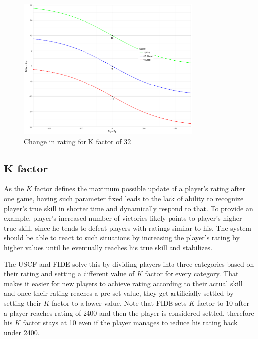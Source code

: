 \begin{figure}[H]
\centering
\includegraphics[width=0.8\textwidth]{figs/elo_k_factor}
\caption{Change in rating for K factor of 32}
\label{fig:k_factor}
\end{figure}

\subsection{K factor}
\label{sec:k_factor}
As the $K$ factor defines the maximum possible update of a player's rating after one game, having such parameter fixed leads to the lack of ability to recognize player's true skill in shorter time and dynamically respond to that. To provide an example, player's increased number of victories likely points to player's higher true skill, since he tends to defeat players with ratings similar to his. The system should be able to react to such situations by increasing the player's rating by higher values until he eventually reaches his true skill and stabilizes.

The USCF and FIDE solve this by dividing players into three categories based on their rating and setting a different value of $K$ factor for every category. That makes it easier for new players to achieve rating according to their actual skill and once their rating reaches a pre-set value, they get artificially settled by setting their $K$ factor to a lower value. Note that FIDE sets $K$ factor to 10 after a player reaches rating of 2400 and then the player is considered settled, therefore his $K$ factor stays at 10 even if the player manages to reduce his rating back under 2400.


